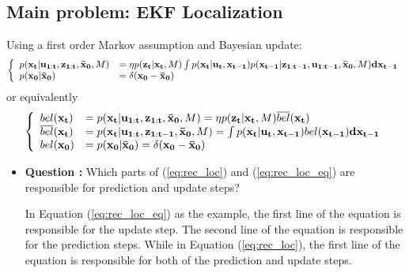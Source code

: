 \documentclass[11pt,a4paper]{article}
\begin{document}
\subsection{Main problem: EKF Localization}
\par Using a first order Markov assumption and Bayesian update:
\begin{equation}
\label{eq:rec_loc}
	\begin{split}
		\left\{
		\begin{array}{ll}
			p({\bf x_t} | {\bf u_{1:t}},{\bf z_{1:t}}, {\bf\bar x_0} ,M) & = \eta p({\bf z_t} | {\bf x_t},M)\int p({\bf x_t}|{\bf u_t},{\bf x_{t-1}}) p({\bf x_{t-1}}|{\bf z_{1:t-1}}, {\bf u_{1:t-1}}, {\bf\bar x_0},M)  {\bf dx_{t-1}}\\
			p(\bf x_0|\bar x_0 ) & = \delta(\bf x_0-\bar x_0)
		\end{array}
		\right.
	\end{split}
\end{equation} 
or equivalently
\begin{equation}
\label{eq:rec_loc_eq}
	\begin{split}
		\left\{
		\begin{array}{ll}
			bel(\bf x_t) &= p({\bf x_t|u_{1:t},z_{1:t},\bar x_0},M) = \eta p({\bf z_t|x_t},M)\overline{bel}(\bf x_t)\\
			\overline{bel}(\bf x_t) &= p({\bf x_t|u_{1:t},z_{1:t-1},\bar x_0},M) = \int p({\bf x_t|u_t,x_{t-1}}) bel({\bf x_{t-1}) dx_{t-1}}\\
			bel(\bf x_0) & = p({\bf x_0|\bar x_0} ) = \delta({\bf x_0-\bar x_0})
		\end{array}
		\right.
	\end{split}
\end{equation}
\begin{itemize}
	\item \addtocounter{cnt_questions}{1} \textbf{Question :} Which parts of (\ref{eq:rec_loc}) and (\ref{eq:rec_loc_eq}) are responsible for prediction and update steps?
		\par In Equation (\ref{eq:rec_loc_eq}) as the example, the first line of the equation is responsible for the update step. The second line of the equation is responsible for the prediction steps. While in Equation (\ref{eq:rec_loc}), the first line of the equation is responsible for both of the prediction and update steps.
\end{itemize}
\end{document}
